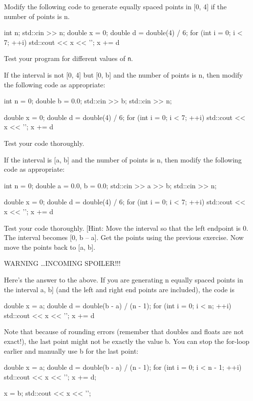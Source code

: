 \begin{ex}
 Modify the following code to generate equally spaced
points in [0, 4] if the number of points is n.
\begin{console}
int n;
std::cin >> n;
double x = 0;
double d = double(4) / 6;
for (int i = 0; i < 7; ++i)
{   
    std::cout << x << '\n';
    x += d
}
\end{console}
Test your program for different values of \texttt{n}.
\end{ex}

\begin{ex}
If the interval is not [0, 4] but [0, b] and the number of points is n, then modify the following code as appropriate:
\begin{console}
int n = 0;
double b = 0.0;
std::cin >> b;
std::cin >> n;

double x = 0;
double d = double(4) / 6;
for (int i = 0; i < 7; ++i)
{   
    std::cout << x << '\n';
    x += d
}
\end{console}
Test your code thoroughly.
\end{ex}

\begin{ex}
If the interval is [a, b] and the number of points is n, then modify the following code as appropriate:
\begin{console}
int n = 0;
double a = 0.0, b = 0.0;
std::cin >> a >> b;
std::cin >> n;

double x = 0;
double d = double(4) / 6;
for (int i = 0; i < 7; ++i)
{   
    std::cout << x << '\n';
    x += d
}
\end{console}
Test your code thoroughly. [Hint: Move the interval so that the left
endpoint is 0. The interval becomes [0, b -- a]. Get the points
using the previous exercise. Now move the points back to [a, b].
\end{ex}
WARNING \ldots INCOMING SPOILER!!!

Here's the answer to the above. If you are generating n
equally spaced points in the interval a, b] (and the left and right
end points are included), the code is
\begin{console}
double x = a;
double d = double(b - a) / (n - 1);
for (int i = 0; i < n; ++i)
{   
    std::cout << x << '\n';
    x += d
}
\end{console}

Note that because of rounding errors (remember that doubles and floats
are not exact!), the last point might not be exactly the value b. You
can stop the for-loop earlier and manually use b for the last point:
\begin{console}
double x = a;
double d = double(b - a) / (n - 1);
for (int i = 0; i < n - 1; ++i)
{   
    std::cout << x << '\n';
    x += d;
}

x = b;
std::cout << x << '\n';
\end{console}

